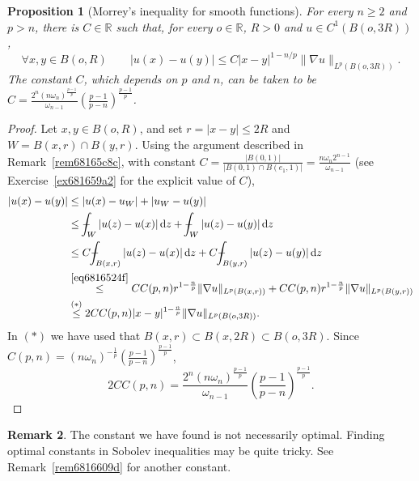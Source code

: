 \documentclass[a4paper,9pt]{amsart}
\newcommand{\R}{\mathbb{R}}	%
\newcommand{\did}{\,\mathrm{d}}	%
\newcommand{\grad}{\nabla}
\def\Xint#1{\mathchoice
      {\XXint\displaystyle\textstyle{#1}}%
      {\XXint\textstyle\scriptstyle{#1}}%
      {\XXint\scriptstyle\scriptscriptstyle{#1}}%
      {\XXint\scriptscriptstyle\scriptscriptstyle{#1}}%
      \!\int}
\def\XXint#1#2#3{{\setbox0=\hbox{$#1{#2#3}{\int}$}
        \vcenter{\hbox{$#2#3$}}\kern-.5\wd0}}
\def\fint{\Xint-}
\theoremstyle{plain}
\newtheorem{proposition}{Proposition}[section]
\theoremstyle{definition}
\newtheorem{remark}[proposition]{Remark}
\theoremstyle{remark}
\begin{document}
\begin{proposition}[Morrey's inequality for smooth functions]\label{prop68165fd2}
	For every $n\ge2$ and $p>n$,
	there is $C\in\R$ such that, 
	for every $o\in\R$, $R>0$ and $u\in C^1(B(o,3R))$,
	\begin{equation}\label{eq68166038}
	\forall x,y\in B(o,R)\qquad
		|u(x)-u(y)| \le C |x-y|^{1-n/p} \|\grad u\|_{L^p(B(o,3R))} .
	\end{equation}
	The constant $C$, which depends on $p$ and $n$, can be taken to be $C=\frac{ 2^n (n\omega_n)^{\frac{p-1}{p}} }{ \omega_{n-1} } \left(\frac{p-1}{p-n}\right)^{\frac{p-1}{p}}$.
\end{proposition}
\begin{proof}
	Let $x,y\in B(o,R)$, and set $r=|x-y|\le 2R$ and $W=B(x,r)\cap B(y,r)$.
	Using the argument described in Remark~\ref{rem68165c8c}, with constant $C=\frac{|B(0,1)|}{|B(0,1)\cap B(e_1,1)|} = \frac{n\omega_n2^{n-1}}{\omega_{n-1}}$ 
	(see Exercise~\ref{ex681659a2} for the explicit value of $C$),
	\begin{align}
		|u(x)-u(y)|
		&\le |u(x) - u_W| + |u_W - u(y)| \\
		&\le \fint_W |u(z)-u(x)| \did z + \fint_W |u(z)-u(y)| \did z \\
		&\le C \fint_{B(x,r)} |u(z)-u(x)| \did z + C \fint_{B(y,r)} |u(z)-u(y)| \did z \\
		&\overset{\eqref{eq6816524f}}\le C C(p,n) r^{1-\frac{n}{p}} \|\grad u\|_{L^p(B(x,r))} + C C(p,n) r^{1-\frac{n}{p}} \|\grad u\|_{L^p(B(y,r))} \\
		&\overset{(*)}\le 2 C C(p,n) |x-y|^{1-\frac{n}{p}} \|\grad u\|_{L^p(B(o,3R))} .
	\end{align}
	In $(*)$ we have used that $B(x,r) \subset B(x,2R)\subset B(o,3R)$.
	Since $C(p,n)=(n\omega_n)^{-\frac1p} \left(\frac{p-1}{p-n}\right)^{\frac{p-1}{p}}$,
	\begin{equation}\label{eq68165dde}
		2 C C(p,n) = \frac{ 2^n (n\omega_n)^{\frac{p-1}{p}} }{ \omega_{n-1} } \left(\frac{p-1}{p-n}\right)^{\frac{p-1}{p}} .
	\end{equation}
\end{proof}

\begin{remark}
	The constant we have found is not necessarily optimal.
	Finding optimal constants in Sobolev inequalities may be quite tricky.
	See Remark~\ref{rem6816609d} for another constant.
\end{remark}
\end{document}
